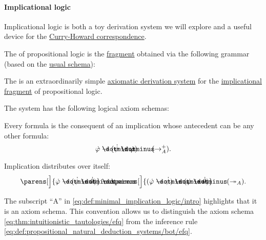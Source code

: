 \paragraph{Implicational logic}\hfill

Implicational logic is both a toy derivation system we will explore and a useful device for the \hyperref[con:curry_howard_correspondence]{Curry-Howard correspondence}.

\begin{definition}\label{def:implicational_propositional_fragment}
  The  of propositional logic is the \hyperref[def:propositional_syntax/fragment]{fragment} obtained via the following grammar (based on the \hyperref[def:propositional_syntax]{usual schema}):
  \begin{bnf*}
     { \bnfor \bnftsq{(} \bnfsp {} \bnfsp \bnftsq{\( \synimplies \)} \bnfsp {} \bnfsp \bnftsq{)}}
  \end{bnf*}
\end{definition}

\begin{definition}\label{def:minimal_implication_logic}
  The  is an extraordinarily simple \hyperref[def:axiomatic_derivation_system]{axiomatic derivation system} for the \hyperref[def:implicational_propositional_fragment]{implicational fragment} of propositional logic.

  The system has the following logical axiom schemas:
  \begin{thmenum}
     Every formula is the consequent of an implication whose antecedent can be any other formula:
    \begin{equation}\label{eq:def:minimal_implication_logic/intro}
      \syn\varphi \synimplies (\syn\psi \synimplies \syn\varphi) \tag{\( \rightarrow_A^+ \)}.
    \end{equation}

     Implication distributes over itself:
    \begin{equation}\label{eq:def:minimal_implication_logic/dist}
      \parens[\Big]{ \syn\varphi \synimplies (\syn\psi \synimplies \syn\theta) } \synimplies \parens[\Big]{ (\syn\varphi \synimplies \syn\psi) \synimplies (\syn\varphi \synimplies \syn\theta)} \tag{\( \twoheadrightarrow_A \)}.
    \end{equation}
  \end{thmenum}
\end{definition}
\begin{comments}
  \item The subscript \enquote{A} in \eqref{eq:def:minimal_implication_logic/intro} highlights that it is an axiom schema. This convention allows us to distinguish the axiom schema \eqref{eq:thm:intuitionistic_tautologies/efq} from the inference rule \eqref{eq:def:propositional_natural_deduction_systems/bot/efq}.
\end{comments}

